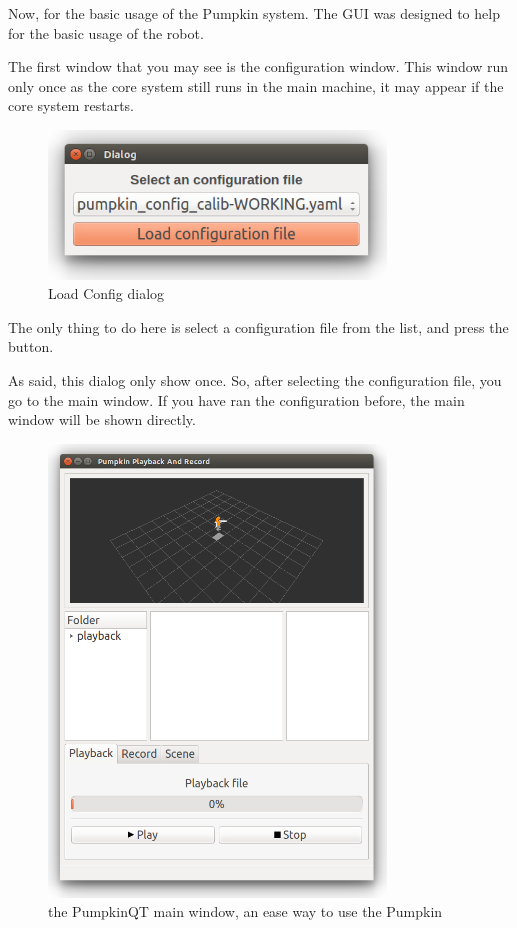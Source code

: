 \documentclass[oneside,a4paper,titlepage]{article}
\begin{document}
Now, for the basic usage of the Pumpkin system. The GUI was designed to help for the basic usage of the robot.

The first window that you may see is the configuration window. This window run only once as the core system still runs in the main machine, it may appear if the core system restarts.

\begin{figure}[h!]
	\centering
	\includegraphics[width=0.8\textwidth]{load_config}
	\caption{Load Config dialog}
	\label{fig:load_config}
\end{figure}

The only thing to do here is select a configuration file from the list, and press the button.

As said, this dialog only show once. So, after selecting the configuration file, you go to the main window. If you have ran the configuration before, the main window will be shown directly.

\begin{figure}[h!]
	\centering
	\includegraphics[width=0.8\textwidth]{main_window}
	\caption[Main Window]{the PumpkinQT main window, an ease way to use the Pumpkin}
	\label{fig:main_window}
\end{figure}
\end{document}
